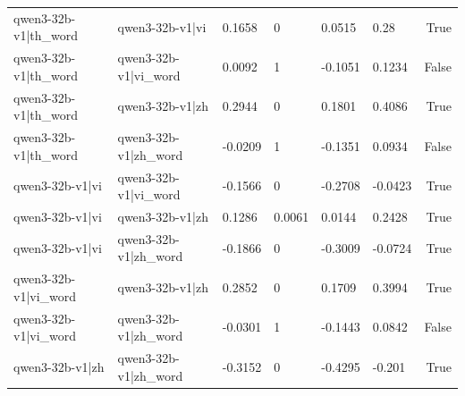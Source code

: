 \begin{table}
\begin{tabular}{llllllr}
qwen3-32b-v1|th_word & qwen3-32b-v1|vi & 0.1658 & 0 & 0.0515 & 0.28 & True \\
qwen3-32b-v1|th_word & qwen3-32b-v1|vi_word & 0.0092 & 1 & -0.1051 & 0.1234 & False \\
qwen3-32b-v1|th_word & qwen3-32b-v1|zh & 0.2944 & 0 & 0.1801 & 0.4086 & True \\
qwen3-32b-v1|th_word & qwen3-32b-v1|zh_word & -0.0209 & 1 & -0.1351 & 0.0934 & False \\
qwen3-32b-v1|vi & qwen3-32b-v1|vi_word & -0.1566 & 0 & -0.2708 & -0.0423 & True \\
qwen3-32b-v1|vi & qwen3-32b-v1|zh & 0.1286 & 0.0061 & 0.0144 & 0.2428 & True \\
qwen3-32b-v1|vi & qwen3-32b-v1|zh_word & -0.1866 & 0 & -0.3009 & -0.0724 & True \\
qwen3-32b-v1|vi_word & qwen3-32b-v1|zh & 0.2852 & 0 & 0.1709 & 0.3994 & True \\
qwen3-32b-v1|vi_word & qwen3-32b-v1|zh_word & -0.0301 & 1 & -0.1443 & 0.0842 & False \\
qwen3-32b-v1|zh & qwen3-32b-v1|zh_word & -0.3152 & 0 & -0.4295 & -0.201 & True \\
\bottomrule
\end{tabular}
\end{table}
